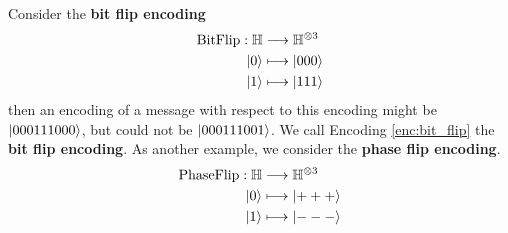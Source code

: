 \documentclass[12pt]{article}
\theoremstyle{plain}
\theoremstyle{definition}
\newcommand{\bb}[1]{\mathbb{#1}}
\newcommand{\lto}{\longrightarrow}
\begin{document}
	Consider the \textbf{bit flip encoding}
	\begin{align}\label{enc:bit_flip}
		\operatorname{BitFlip}: \bb{H} &\lto \bb{H}^{\otimes 3}\\
		\ket{0} &\longmapsto \ket{000}\\
		\ket{1} &\longmapsto \ket{111}
	\end{align}
	then an encoding of a message with respect to this encoding might be $\ket{000111000}$, but could not be $\ket{000111001}$. We call Encoding \ref{enc:bit_flip} the \textbf{bit flip encoding}. As another example, we consider the \textbf{phase flip encoding}.
	\begin{align*}
		\operatorname{PhaseFlip}: \bb{H} &\lto \bb{H}^{\otimes 3}\\
		\ket{0} &\longmapsto \ket{+++}\\
		\ket{1} &\longmapsto \ket{---}
	\end{align*}
\end{document}
